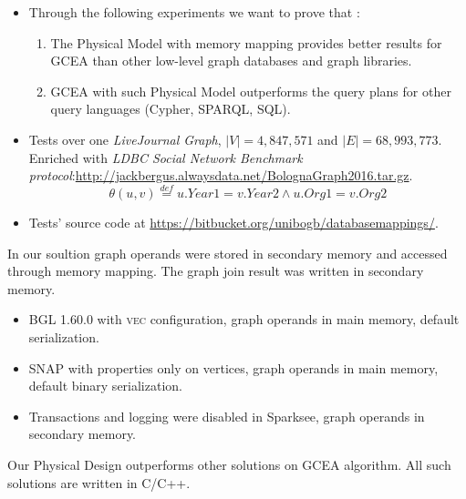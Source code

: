 

\begin{multilucido}[GCEA]
	\begin{sottolucido}
		\begin{itemize}
			\item Through the following experiments we want to prove that :
			\begin{enumerate}
				\item The Physical Model with memory mapping provides better results for GCEA than other low-level graph databases and graph libraries.
				\item GCEA with such Physical Model outperforms the query plans for other query languages (Cypher, SPARQL, SQL). 
			\end{enumerate} 
			\item Tests over one \textit{LiveJournal Graph}, $|V|=4,847,571$ and $|E|=68,993,773$. Enriched with \textit{LDBC Social Network Benchmark protocol}:\url{http://jackbergus.alwaysdata.net/BolognaGraph2016.tar.gz}. 
			\[\theta(u,v)\overset{def}{=}u.Year1 = v.Year2\wedge u.Org1 = v.Org2\]
			\item Tests' source code at \url{https://bitbucket.org/unibogb/databasemappings/}.
		\end{itemize}
	\end{sottolucido}


	\begin{sottolucido}
		In our soultion graph operands were stored in secondary memory and accessed through
		memory mapping. The graph join result was written in secondary memory.
		\begin{itemize}
			\item BGL 1.60.0 with \textsc{vec} configuration, graph operands in main memory, default serialization.
			\item SNAP with properties only on vertices, graph operands in main memory, default binary serialization.
			\item Transactions and logging were disabled in Sparksee, graph operands in secondary memory.
		\end{itemize}
		Our Physical Design outperforms other solutions on GCEA algorithm. All such solutions are written in C/C++.
	\end{sottolucido}



\end{multilucido}
